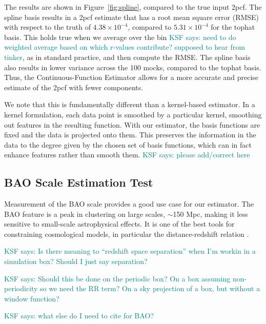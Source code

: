 \documentclass[modern]{aastex62}
\newcommand{\cf}{2pcf\xspace} %
\newcommand{\est}{the Continuous-Function Estimator\xspace}
\newcommand{\KSF}[1]{\textcolor{teal}{KSF says: #1}}
\begin{document}
The results are shown in Figure~\ref{fig:spline}, compared to the true input \cf.
The spline basis results in a \cf estimate that has a root mean square error (RMSE) with respect to the truth of $4.38 \times 10^{-4}$, compared to $5.31 \times 10^{-4}$ for the tophat basis.
This holds true when we average over the bin \KSF{need to do weighted average based on which r-values contribute? supposed to hear from tinker}, as in standard practice, and then compute the RMSE.
The spline basis also results in lower variance across the 100 mocks, compared to the tophat basis.
Thus, \est allows for a more accurate and precise estimate of the \cf with fewer components.

We note that this is fundamentally different than a kernel-based estimator.
In a kernel formulation, each data point is smoothed by a particular kernel, smoothing out features in the resulting function.
With our estimator, the basis functions are fixed and the data is projected onto them.
This preserves the information in the data to the degree given by the chosen set of basis functions, which can in fact enhance features rather than smooth them.
\KSF{please add/correct here}

\subsection{BAO Scale Estimation Test}

Measurement of the BAO scale provides a good use case for our estimator.
The BAO feature is a peak in clustering on large scales, $\sim$150 Mpc, making it less sensitive to small-scale astrophysical effects.
It is one of the best tools for constraining cosmological models, in particular the distance-redshift relation \citep{Kazin2010, Anderson2012, Anderson2014, Alam2016}.

\KSF{Is there meaning to ``redshift space separation'' when I'm workin in a simulation box? Should I just say separation?}

\KSF{Should this be done on the periodic box? On a box assuming non-periodicity so we need the RR term? On a sky projection of a box, but without a window function?}

\KSF{what else do I need to cite for BAO?}
\end{document}
